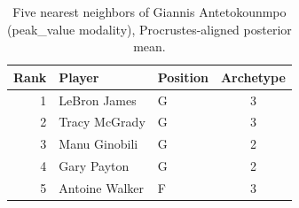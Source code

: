 \begin{table}[htbp]
  \centering\small
  \begin{tabular}{rllc}
    \toprule
    Rank & Player & Position & Archetype \\
    \midrule
    1 & LeBron James & G & 3 \\
    2 & Tracy McGrady & G & 3 \\
    3 & Manu Ginobili & G & 2 \\
    4 & Gary Payton & G & 2 \\
    5 & Antoine Walker & F & 3 \\
    \bottomrule
  \end{tabular}
  \caption{Five nearest neighbors of Giannis Antetokounmpo (peak_value modality), Procrustes-aligned posterior mean.}
  \label{tab:Giannis_Antetokounmpo_neighbors_peak_value}
\end{table}

